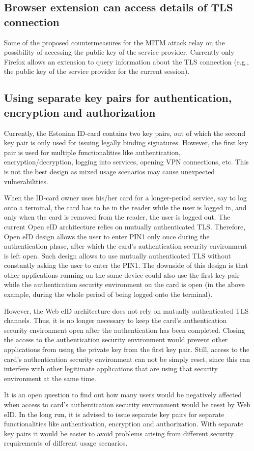 \subsection{Browser extension can access details of TLS connection}
Some of the proposed countermeasures for the MITM attack relay on the possibility of accessing the public key of the service provider. Currently only Firefox allows an extension to query information about the TLS connection (e.g., the public key of the service provider for the current session).


\subsection{Using separate key pairs for authentication, encryption and authorization}
\label{subsec:separatekeypairs}
Currently, the Estonian ID-card contains two key pairs, out of which the second key pair is only used for issuing legally binding signatures. However, the first key pair is used for multiple functionalities like authentication, encryption/decryption, logging into services, opening VPN connections, etc. This is not the best design as mixed usage scenarios may cause unexpected vulnerabilities.

When the ID-card owner uses his/her card for a longer-period service, say to log onto a terminal, the card has to be in the reader while the user is logged in, and only when the card is removed from the reader, the user is logged out. The current Open eID architecture relies on mutually authenticated TLS. Therefore, Open eID design allows the user to enter PIN1 only once during the authentication phase, after which the card's authentication security environment is left open. Such design allows to use mutually authenticated TLS without constantly asking the user to enter the PIN1. The downside of this design is that other applications running on the same device could also use the first key pair while the authentication security environment on the card is open (in the above example, during the whole period of being logged onto the terminal).

However, the Web eID architecture does not rely on mutually authenticated TLS channels. Thus, it is no longer necessary to keep the card's authentication security environment open after the authentication has been completed. Closing the access to the authentication security environment would prevent other applications from using the private key from the first key pair. Still, access to the card's authentication security environment can not be simply reset, since this can interfere with other legitimate applications that are using that security environment at the same time.

It is an open question to find out how many users would be negatively affected when access to card's authentication security environment would be reset by Web eID. In the long run, it is advised to issue separate key pairs for separate functionalities like authentication, encryption and authorization. With separate key pairs it would be easier to avoid problems arising from different security requirements of different usage scenarios.

